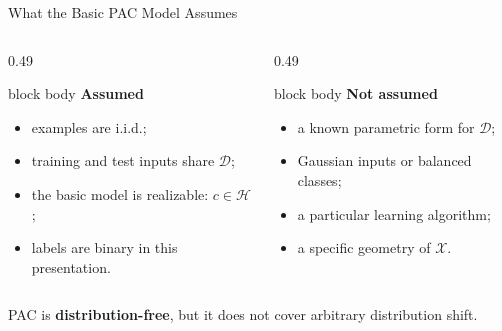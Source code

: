 \documentclass[aspectratio=169,10pt]{beamer}
\newcommand{\X}{\mathcal{X}}
\newcommand{\D}{\mathcal{D}}
\newcommand{\Hc}{\mathcal{H}}
\newcommand{\tightitems}{%
  \setlength{\itemsep}{0.14cm}%
  \setlength{\topsep}{0.08cm}%
  \setlength{\parsep}{0pt}%
}
\begin{document}
\begin{frame}[t]{What the Basic PAC Model Assumes}
  \vspace{0.18cm}
  \begin{columns}[T,totalwidth=\textwidth]
    \begin{column}{0.49\textwidth}
      \begin{beamercolorbox}[rounded=true,sep=0.25cm,wd=\linewidth]{block body}
        {\normalsize\bfseries Assumed}
        \begin{itemize}
          \tightitems
          \item examples are i.i.d.;
          \item training and test inputs share $\D$;
          \item the basic model is realizable: $c\in\Hc$;
          \item labels are binary in this presentation.
        \end{itemize}
      \end{beamercolorbox}
    \end{column}
    \begin{column}{0.49\textwidth}
      \begin{beamercolorbox}[rounded=true,sep=0.25cm,wd=\linewidth]{block body}
        {\normalsize\bfseries Not assumed}
        \begin{itemize}
          \tightitems
          \item a known parametric form for $\D$;
          \item Gaussian inputs or balanced classes;
          \item a particular learning algorithm;
          \item a specific geometry of $\X$.
        \end{itemize}
      \end{beamercolorbox}
    \end{column}
  \end{columns}
  \vspace{0.35cm}
  \centering
  {\normalsize PAC is \textbf{distribution-free}, but it does not cover arbitrary distribution shift.}
\end{frame}
\end{document}
